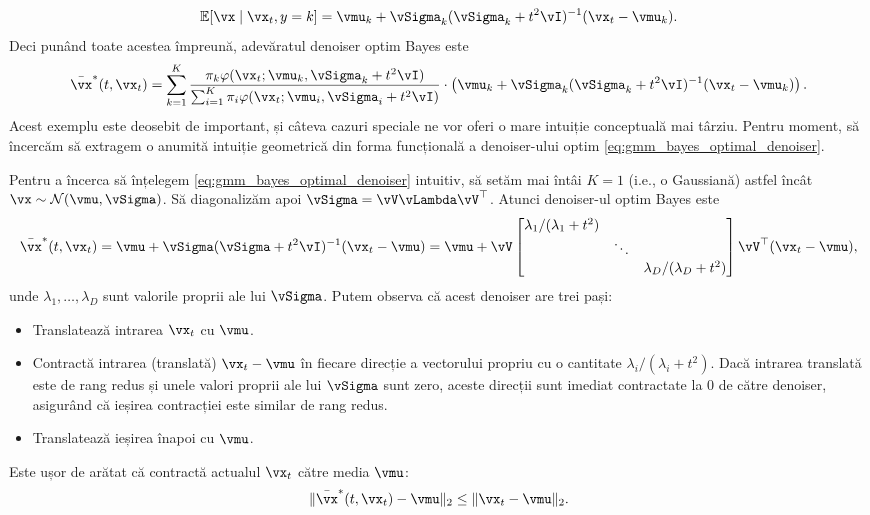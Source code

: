 \documentclass[../../book-main_ro.tex]{subfiles}
\begin{document}
\begin{example}
	\begin{equation}
		\Ex[\vx \mid \vx_{t}, y = k] = \vmu_{k} + \vSigma_{k}(\vSigma_{k} + t^{2}\vI)^{-1}(\vx_{t} - \vmu_{k}).
	\end{equation}
	Deci punând toate acestea împreună, adevăratul denoiser optim Bayes este
	\begin{equation}\label{eq:gmm_bayes_optimal_denoiser}
		\bar{\vx}^{\ast}(t, \vx_{t}) = \sum_{k = 1}^{K}\frac{\pi_{k}\phi(\vx_{t}
		;\vmu_{k}, \vSigma_{k} + t^{2}\vI)}{\sum_{i = 1}^{K}\pi_{i}\phi(\vx_{t}
		;\vmu_{i}, \vSigma_{i} + t^{2}\vI)}\cdot\bp{\vmu_{k} + \vSigma_{k}(\vSigma_{k} + t^{2}\vI)^{-1}(\vx_{t} - \vmu_{k})}.
	\end{equation}
	Acest exemplu este deosebit de important, și câteva cazuri speciale ne vor oferi o mare intuiție conceptuală mai târziu. Pentru moment, să încercăm să extragem o anumită intuiție geometrică din forma funcțională a denoiser-ului optim \eqref{eq:gmm_bayes_optimal_denoiser}.

	Pentru a încerca să înțelegem \eqref{eq:gmm_bayes_optimal_denoiser} intuitiv, să setăm mai întâi \(K = 1\) (i.e., o Gaussiană) astfel încât \(\vx \sim \dNorm(\vmu, \vSigma)\). Să diagonalizăm apoi \(\vSigma = \vV\vLambda \vV^{\top}\). Atunci denoiser-ul optim Bayes este
	\begin{equation}
		\bar{\vx}^{\ast}(t, \vx_{t}) = \vmu + \vSigma(\vSigma + t^{2}\vI)^{-1}(\vx_{t} - \vmu) = \vmu + \vV\mat{\lambda_{1}/(\lambda_{1} + t^{2}) & & \\ & \ddots & \\ & & \lambda_{D}/(\lambda_{D} + t^{2})}\vV^{\top}(\vx_{t} - \vmu),
	\end{equation}
	unde \(\lambda_{1}, \dots, \lambda_{D}\) sunt valorile proprii ale lui \(\vSigma\). Putem observa că acest denoiser are trei pași:
	\begin{itemize}
		\item Translatează intrarea \(\vx_{t}\) cu \(\vmu\).
		\item Contractă intrarea (translată) \(\vx_{t} - \vmu\) în fiecare direcție a vectorului propriu cu o cantitate \(\lambda_{i}/(\lambda_{i} + t^{2})\). Dacă intrarea translată este de rang redus și unele valori proprii ale lui \(\vSigma\) sunt zero, aceste direcții sunt imediat contractate la \(0\) de către denoiser, asigurând că ieșirea contracției este similar de rang redus.
		\item Translatează ieșirea înapoi cu \(\vmu\).
	\end{itemize}
	Este ușor de arătat că contractă actualul \(\vx_{t}\) către media \(\vmu\):
	\begin{equation}\label{eq:contraction}
		\norm{\bar{\vx}^{\ast}(t, \vx_{t}) - \vmu}_{2} \leq \norm{\vx_{t} - \vmu}_{2}.
	\end{equation}


\end{example}
\end{document}
